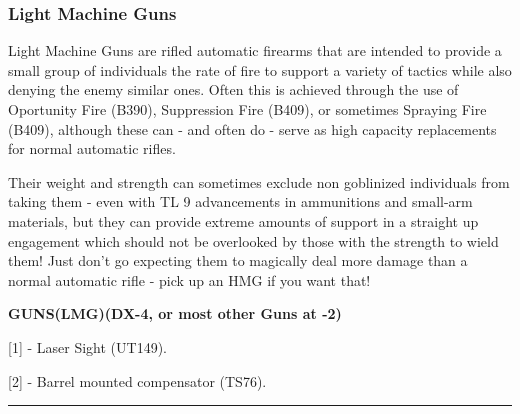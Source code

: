 \subsubsection{Light Machine Guns}

Light Machine Guns are rifled automatic firearms that are intended to provide a small group of individuals the rate of fire to support a variety of tactics while also denying the enemy similar ones. Often this is achieved through the use of Oportunity Fire (B390), Suppression Fire (B409), or sometimes Spraying Fire (B409), although these can - and often do - serve as high capacity replacements for normal automatic rifles.

Their weight and strength can sometimes exclude non goblinized individuals from taking them - even with TL 9 advancements in ammunitions and small-arm materials, but they can provide extreme amounts of support in a straight up engagement which should not be overlooked by those with the strength to wield them! Just don't go expecting them to magically deal more damage than a normal automatic rifle - pick up an HMG if you want that!

\textbf{GUNS(LMG)(DX-4, or most other Guns at -2)}
\begin{center} 
	\begin{adjustwidth}{-9.5mm}{}
	\end{adjustwidth}
\end{center}

[1] - Laser Sight (UT149).

[2] - Barrel mounted compensator (TS76).

\par\rule{\textwidth}{0.5pt} 

